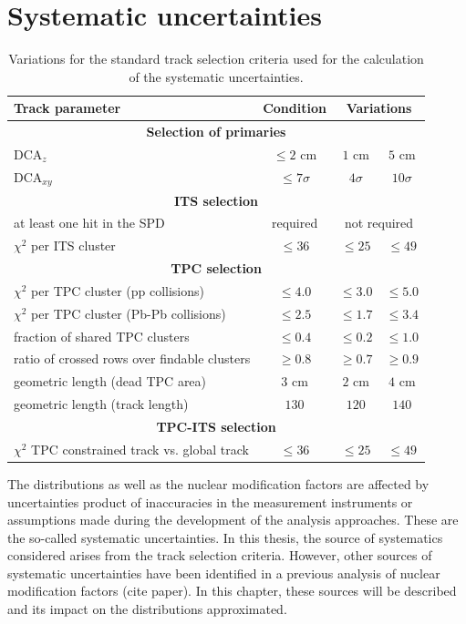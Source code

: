 \documentclass[12pt,a4paper]{report}
\begin{document}
\section{Systematic uncertainties}
\begin{table}[tb!]
\renewcommand{\arraystretch}{1.5}
\centering
\begin{tabular}{l c c c}
\toprule
\rowcolor{headerBlue}  \textbf{Track parameter} &  \textbf{Condition}  &  \multicolumn{2}{c}{\textbf{Variations}} \\
\midrule
\multicolumn{4}{c}{\textbf{Selection of primaries}} \\
\midrule
$\text{DCA}_{z}$ & $\leq 2 $ cm & $1$ cm & $5$ cm\\
$\text{DCA}_{xy}$ & $\leq 7\sigma$ & $4\sigma$ & $10\sigma$ \\
\midrule
\multicolumn{4}{c}{\textbf{ITS selection}} \\
\midrule
at least one hit in the SPD & required  & \multicolumn{2}{c}{not required}\\
$\chi^2$ per ITS cluster  & $\leq 36$ & $\leq 25$ & $\leq 49$ \\
\midrule
\multicolumn{4}{c}{\textbf{TPC selection}} \\
\midrule
$\chi^2$ per TPC cluster (pp collisions) & $\leq 4.0$  & $\leq 3.0$ & $\leq 5.0$\\
$\chi^2$ per TPC cluster (Pb-Pb collisions) & $\leq 2.5$ & $\leq 1.7$ & $\leq 3.4$\\
fraction of shared  TPC clusters&  $\leq 0.4$  & $\leq 0.2$ & $\leq 1.0$ \\
ratio of crossed rows over findable clusters  & $\geq 0.8$ & $\geq 0.7$ & $\geq 0.9$\\
geometric length (dead TPC area) & $3$ cm & $2$ cm & $4$ cm \\
geometric length (track length) & $130$ & $120$  & $140$ \\

\midrule
\multicolumn{4}{c}{\textbf{TPC-ITS selection}} \\
\midrule
$\chi^2$ TPC constrained track vs. global track  & $\leq 36$ & $\leq 25$ & $\leq 49$ \\
\bottomrule
\end{tabular}
\caption{Variations for the standard track selection criteria used for the calculation of the systematic uncertainties.}
\label{tab:curVar}
\end{table}
The \pt distributions as well as the nuclear modification factors are affected by uncertainties product of inaccuracies in the measurement instruments or assumptions made during the development of the analysis approaches. These are the so-called systematic uncertainties. In this thesis, the source of systematics considered arises from the track selection criteria. However, other sources of systematic uncertainties have been identified in a previous analysis of nuclear modification factors (cite paper). In this chapter, these sources will be described and its impact on the \pt distributions approximated.
\end{document}
